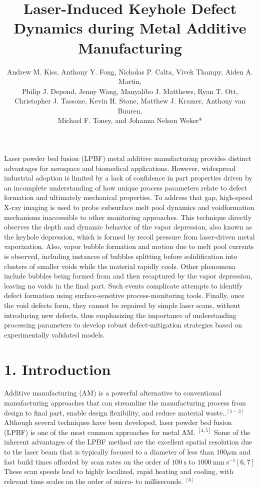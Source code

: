 \documentclass[10pt]{article}
\title{Laser-Induced Keyhole Defect Dynamics during Metal Additive Manufacturing }
\author{Andrew M. Kiss, Anthony Y. Fong, Nicholas P. Calta, Vivek Thampy, Aiden A. Martin,\\
Philip J. Depond, Jenny Wang, Manyalibo J. Matthews, Ryan T. Ott,\\
Christopher J. Tassone, Kevin H. Stone, Matthew J. Kramer, Anthony van Buuren,\\
Michael F. Toney, and Johanna Nelson Weker*}
\date{}
\begin{document}
\maketitle
Laser powder bed fusion (LPBF) metal additive manufacturing provides distinct advantages for aerospace and biomedical applications. However, widespread industrial adoption is limited by a lack of confidence in part properties driven by an incomplete understanding of how unique process parameters relate to defect formation and ultimately mechanical properties. To address that gap, high-speed $\mathrm{X}$-ray imaging is used to probe subsurface melt pool dynamics and voidformation mechanisms inaccessible to other monitoring approaches. This technique directly observes the depth and dynamic behavior of the vapor depression, also known as the keyhole depression, which is formed by recoil pressure from laser-driven metal vaporization. Also, vapor bubble formation and motion due to melt pool currents is observed, including instances of bubbles splitting before solidification into clusters of smaller voids while the material rapidly cools. Other phenomena include bubbles being formed from and then recaptured by the vapor depression, leaving no voids in the final part. Such events complicate attempts to identify defect formation using surface-sensitive process-monitoring tools. Finally, once the void defects form, they cannot be repaired by simple laser scans, without introducing new defects, thus emphasizing the importance of understanding processing parameters to develop robust defect-mitigation strategies based on experimentally validated models.

\section*{1. Introduction}
Additive manufacturing (AM) is a powerful alternative to conventional manufacturing approaches that can streamline the manufacturing process from design to final part, enable design flexibility, and reduce material waste..$^{[1-3]}$ Although several techniques have been developed, laser powder bed fusion (LPBF) is one of the most common approaches for metal AM. ${ }^{[4,5]}$ Some of the inherent advantages of the LPBF method are the excellent spatial resolution due to the laser beam that is typically focused to a diameter of less than $100 \mu \mathrm{m}$ and fast build times afforded by scan rates on the order of $100 \mathrm{~s}$ to $1000 \mathrm{~mm} \mathrm{~s}^{-1}[6,7]$ These scan speeds lead to highly localized, rapid heating and cooling, with relevant time scales on the order of micro- to milliseconds. ${ }^{[6]}$
\end{document}
